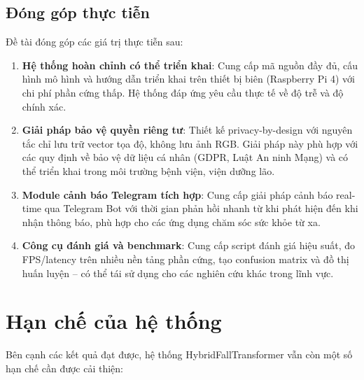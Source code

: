 \subsection{Đóng góp thực tiễn}
\label{sec:practical_contributions}

Đề tài đóng góp các giá trị thực tiễn sau:

\begin{enumerate}
    \item \textbf{Hệ thống hoàn chỉnh có thể triển khai}: Cung cấp mã nguồn đầy đủ, cấu hình mô hình và hướng dẫn triển khai trên thiết bị biên (Raspberry Pi 4) với chi phí phần cứng thấp. Hệ thống đáp ứng yêu cầu thực tế về độ trễ và độ chính xác.
    
    \item \textbf{Giải pháp bảo vệ quyền riêng tư}: Thiết kế privacy-by-design với nguyên tắc chỉ lưu trữ vector tọa độ, không lưu ảnh RGB. Giải pháp này phù hợp với các quy định về bảo vệ dữ liệu cá nhân (GDPR, Luật An ninh Mạng) và có thể triển khai trong môi trường bệnh viện, viện dưỡng lão.
    
    \item \textbf{Module cảnh báo Telegram tích hợp}: Cung cấp giải pháp cảnh báo real-time qua Telegram Bot với thời gian phản hồi nhanh từ khi phát hiện đến khi nhận thông báo, phù hợp cho các ứng dụng chăm sóc sức khỏe từ xa.
    
    \item \textbf{Công cụ đánh giá và benchmark}: Cung cấp script đánh giá hiệu suất, đo FPS/latency trên nhiều nền tảng phần cứng, tạo confusion matrix và đồ thị huấn luyện -- có thể tái sử dụng cho các nghiên cứu khác trong lĩnh vực.
\end{enumerate}

\section{Hạn chế của hệ thống}
\label{sec:limitations}

Bên cạnh các kết quả đạt được, hệ thống HybridFallTransformer vẫn còn một số hạn chế cần được cải thiện:

